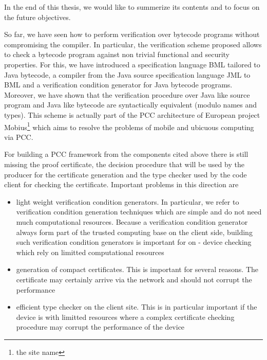 
In the end of this thesis, we would like to summerize 
its contents and to focus on the future objectives. 

So far, we have seen how to perform verification over bytecode
programs without compromising the compiler. In particular, the verification 
scheme proposed allows to check a bytecode program against 
non trivial functional and security properties. For this, we have 
introduced a specification language BML tailored to Java bytecode, a compiler
from the Java source specification language JML to BML and a verification 
condition generator for Java bytecode programs. Moreover, we have
shown that the verification procedure over Java like source program 
and Java like bytecode are syntactically equivalent (modulo names and types). 
This scheme is actually part of the PCC architecture of 
European project Mobius\footnote{the site name} which aims to resolve the problems
of mobile and ubicuous computing via PCC.

For building a PCC framework from the components cited above 
there is still missing the proof certificate, the decision procedure
that will be used by the producer for the certificate generation and the type checker used by the code
client for checking the certificate. Important problems in this direction are
\begin{itemize}
  \item light weight verification condition generators. In particular, we refer 
        to verification condition generation techniques which are simple and do not need
	much computational resources. Because a verification condition generator always
	form part of the trusted computing base on the client side, building such verification 
	condition generators is important for on - device checking which rely on limitted computational 
	resources  
  
  \item generation of compact certificates. This is important for several reasons.
        The certificate may certainly  arrive via the network and should not corrupt the performance 
 

 \item efficient type checker on the client site. This is in particular important 
        if the device is with limitted resources where a complex certificate checking procedure
        may corrupt the performance of the device
       
    
\end{itemize}


